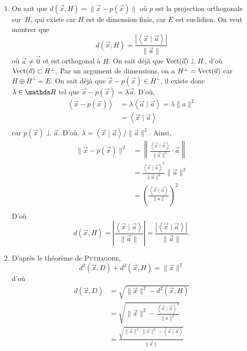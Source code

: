 \begin{exo}
	\begin{enumerate}
		\item On sait que $d(\vec{x}, H) = \|\vec{x} - p(\vec{x})\|$\/ où $p$\/ est la projection orthogonale sur~$H$, qui existe car $H$\/ est de dimension finie, car $E$\/ est euclidien. On veut montrer que \[
				d(\vec{x}, H) = \frac{\left| \left<\vec{x}  \mid \vec{a} \right> \right|}{\|\vec{a}\|}
			\] où $\vec{a} \neq \vec{0}$\/ et est orthogonal à $H$. On sait déjà que $\operatorname{Vect}(\vec{a}) \perp H$, d'où $\operatorname{Vect}(\vec{a}) \subset H^\perp$. Par un argument de dimensions, on a $H^\perp = \operatorname{Vect}(\vec{a})$ car $H \oplus H^\perp = E$. On sait déjà que $\vec{x} - p(\vec{x}) \in H^\perp$, il existe donc $\lambda \in \R$\/ tel que $\vec{x} - p(\vec{x}) = \lambda \vec{a}$. D'où,
			\begin{align*}
				\left<\vec{x} - p(\vec{x}) \right> &= \lambda \left<\vec{a}  \mid  \vec{a} \right> = \lambda \|a\|^2 \\
				&= \left<\vec{x}  \mid \vec{a} \right> \\
			\end{align*}
			car $p(\vec{x}) \perp \vec{a}$. D'où, $\lambda = \left<\vec{x} \mid \vec{a} \right> / \|\vec{a}\|^2$. Ainsi, 
			\begin{align*}
				\|\vec{x} - p(\vec{x})\|^2 &= \left\| \frac{\left<\vec{x} \mid \vec{a} \right>}{\|\vec{a}\|^2} \cdot \vec{a}\right\| \\
				&= \frac{\left<\vec{x} \mid \vec{a} \right>^2}{\|\vec{a}\|^4} \|\vec{a}\|^2\\
				&= \left( \frac{\left<\vec{x}  \mid \vec{a} \right>}{\|a\|} \right)^2 \\
			\end{align*}
			D'où \[
				d(\vec{x}, H) = \left| \frac{\left<\vec{x} \mid \vec{a} \right>}{\|\vec{a}\|} \right| = \frac{\left| \left<\vec{x}  \mid \vec{a} \right> \right|}{\|\vec{a}\|}
			.\]
		\item D'après le théorème de \textsc{Pythagore}, \[
				d^2(\vec{x}, D) + d^2(\vec{x}, H) = \|\vec{x}\|^2
			\] d'où 
			\begin{align*}
				d(\vec{x}, D) &= \sqrt{\|\vec{x}\|^2 - d^2(\vec{x}, H)} \\
				&= \sqrt{\|\vec{x}\|^2 - \frac{\left<\vec{x} \mid \vec{a} \right>^2}{\|a\|^2}} \\
				&= \frac{\sqrt{\|\vec{a}\|^2 \cdot \|\vec{x}\|^2 - \left<\vec{x}  \mid \vec{a} \right>}}{\|\vec{a}\|}  \\
			\end{align*}
	\end{enumerate}
\end{exo}

